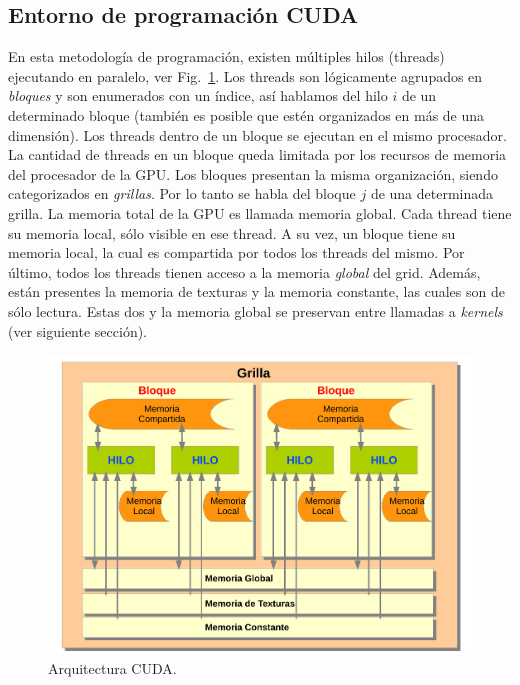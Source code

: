 \subsection{Entorno de programación CUDA}
En esta metodolog\'ia de programaci\'on, existen m\'ultiples hilos (threads) ejecutando en paralelo, ver Fig.~\ref{fg:cuda}.
Los threads son l\'ogicamente agrupados en {\em bloques} y son enumerados con un \'indice, as\'i hablamos del hilo $i$ de un determinado bloque (también es posible que estén organizados en más de una dimensión).
Los threads dentro de un bloque se ejecutan en el mismo procesador.
La cantidad de threads en un bloque queda limitada por los recursos de memoria del procesador de la GPU. Los bloques presentan la misma organizaci\'on, siendo categorizados en {\em grillas}. 
Por lo tanto se habla del bloque $j$ de una determinada grilla.
La memoria total de la GPU es llamada memoria global. Cada thread tiene su memoria local, s\'olo visible en ese thread.
A su vez, un bloque tiene su memoria local, la cual es compartida por todos los threads del mismo.
Por \'ultimo, todos los threads tienen acceso a la memoria {\em global} del grid.
Adem\'as, est\'an presentes la memoria de texturas y la memoria constante, las cuales son de s\'olo lectura.
Estas dos y la memoria global se preservan entre llamadas a {\em kernels} (ver siguiente secci\'on).

\begin{figure}[h]
\begin{center}
\includegraphics[width=13cm]{figures/cuda}
\end{center}
\caption{Arquitectura CUDA.}
\label{fg:cuda}
\end{figure}


